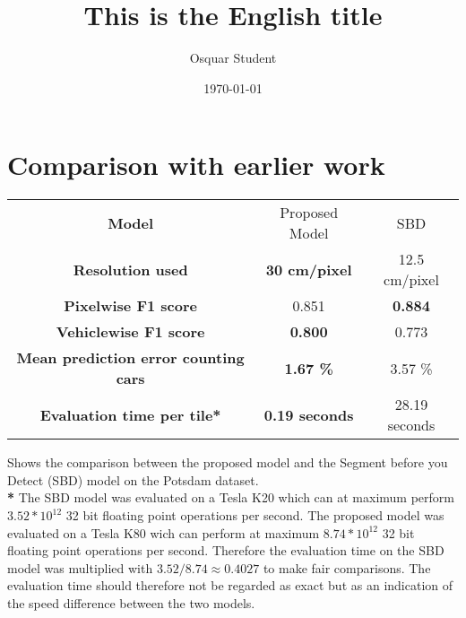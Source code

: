 \documentclass{kththesis}
\title{This is the English title}
\author{Osquar Student}
\date{\today}
\begin{document}
\section{Comparison with earlier work}
\begin{center}
 \label{tab:potsdam} 
\begin{tabular}{|c | c | c|}
\hline
\textbf{Model} & Proposed Model & SBD \\
\textbf{Resolution used} & \textbf{30 cm/pixel} & 12.5 cm/pixel\\
\textbf{Pixelwise F1 score} & 0.851 & \textbf{0.884}\\
\textbf{Vehiclewise F1 score} & \textbf{0.800} &  0.773\\
\textbf{Mean prediction error counting cars} & \textbf{1.67 \%} &  3.57 \%\\
\textbf{Evaluation time per tile*} & \textbf{0.19 seconds} &  28.19 seconds\\
\hline
\end{tabular}\caption{Shows the comparison between the proposed model and the Segment before you Detect (SBD) model \parencite{audebert_usability_2016} on the Potsdam dataset.\\ \textbf{*} The SBD model was evaluated on a Tesla K20 which can at maximum perform $3.52*10^{12}$ 32 bit floating point operations per second. The proposed model was evaluated on a Tesla K80 wich can perform at maximum $8.74*10^{12}$ 32 bit floating point operations per second. Therefore the evaluation time on the SBD model was multiplied with $3.52/8.74\approx0.4027$ to make fair comparisons. The evaluation time should therefore not be regarded as exact but as an indication of the speed difference between the two models.}
\end{center}
\end{document}
